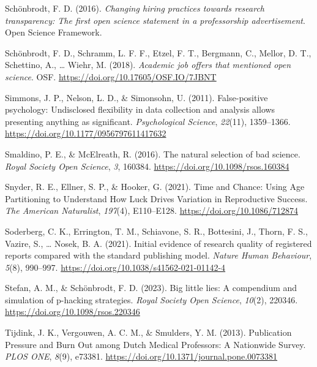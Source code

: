 \documentclass[
  ,man,mask,floatsintext]{apa6}
\newlength{\cslhangindent}
\newlength{\cslentryspacingunit} %
\newenvironment{CSLReferences}[2] %
 {%
  \setlength{\parindent}{0pt}
  \ifodd #1
  \let\oldpar\par
  \def\par{\hangindent=\cslhangindent\oldpar}
  \fi
  \setlength{\parskip}{#2\cslentryspacingunit}
 }%
 {}
\begin{document}
\begin{CSLReferences}{1}{0}
\leavevmode{}%
Schönbrodt, F. D. (2016). \emph{Changing hiring practices towards research transparency: {The} first open science statement in a professorship advertisement}. Open Science Framework.

\leavevmode{}%
Schönbrodt, F. D., Schramm, L. F. F., Etzel, F. T., Bergmann, C., Mellor, D. T., Schettino, A., \ldots{} Wiehr, M. (2018). \emph{Academic job offers that mentioned open science}. OSF. \url{https://doi.org/10.17605/OSF.IO/7JBNT}

\leavevmode{}%
Simmons, J. P., Nelson, L. D., \& Simonsohn, U. (2011). False-positive psychology: {Undisclosed} flexibility in data collection and analysis allows presenting anything as significant. \emph{Psychological Science}, \emph{22}(11), 1359--1366. \url{https://doi.org/10.1177/0956797611417632}

\leavevmode{}%
Smaldino, P. E., \& McElreath, R. (2016). The natural selection of bad science. \emph{Royal Society Open Science}, \emph{3}, 160384. \url{https://doi.org/10.1098/rsos.160384}

\leavevmode{}%
Snyder, R. E., Ellner, S. P., \& Hooker, G. (2021). Time and {Chance}: {Using Age Partitioning} to {Understand How Luck Drives Variation} in {Reproductive Success}. \emph{The American Naturalist}, \emph{197}(4), E110--E128. \url{https://doi.org/10.1086/712874}

\leavevmode{}%
Soderberg, C. K., Errington, T. M., Schiavone, S. R., Bottesini, J., Thorn, F. S., Vazire, S., \ldots{} Nosek, B. A. (2021). Initial evidence of research quality of registered reports compared with the standard publishing model. \emph{Nature Human Behaviour}, \emph{5}(8), 990--997. \url{https://doi.org/10.1038/s41562-021-01142-4}

\leavevmode{}%
Stefan, A. M., \& Schönbrodt, F. D. (2023). Big little lies: A compendium and simulation of p-hacking strategies. \emph{Royal Society Open Science}, \emph{10}(2), 220346. \url{https://doi.org/10.1098/rsos.220346}

\leavevmode{}%
Tijdink, J. K., Vergouwen, A. C. M., \& Smulders, Y. M. (2013). Publication {Pressure} and {Burn Out} among {Dutch Medical Professors}: {A Nationwide Survey}. \emph{PLOS ONE}, \emph{8}(9), e73381. \url{https://doi.org/10.1371/journal.pone.0073381}


\end{CSLReferences}
\end{document}
